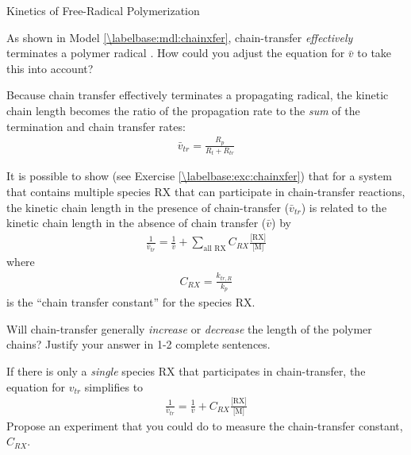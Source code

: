 \begin{activity}{Kinetics of Free-Radical Polymerization}
\begin{model}
\end{model}

\begin{ctqs}
	\question As shown in Model \ref{\labelbase:mdl:chainxfer}, chain-transfer \emph{effectively} terminates a polymer radical .
		How could you adjust the equation for $\bar v$ to take this into account?
		
		\begin{solution}[2in]
	
			Because chain transfer effectively terminates a propagating radical, the kinetic chain length becomes the ratio of the propagation rate to the \emph{sum} of the termination and chain transfer rates:
			\begin{align*}
				\bar v_{tr} = \frac{R_p}{R_t + R_{tr}}
			\end{align*}
	
		\end{solution}
		
\end{ctqs}

\begin{infobox}
\label{\labelbase:info:vtr}

	It is possible to show (see Exercise \ref{\labelbase:exc:chainxfer}) that for a system that contains multiple species RX that can participate in chain-transfer reactions, the kinetic chain length in the presence of chain-transfer ($\bar v_{tr}$) is related to the kinetic chain length in the absence of chain transfer ($\bar v$) by
	\begin{align*}
		\frac{1}{\bar v_{tr}} = \frac{1}{\bar v} + \sum_{\text{all RX}} C_{RX}\frac{\text{[RX]}}{\text{[M]}}
	\end{align*}
	where
	\begin{align*}
		C_{RX} = \frac{k_{tr,R}}{k_p}
	\end{align*}
	is the ``chain transfer constant'' for the species RX.
	
\end{infobox}

\begin{ctqs}

	\question Will chain-transfer generally \emph{increase} or \emph{decrease} the length of the polymer chains?  Justify your answer in 1-2 complete sentences.
	
		\begin{solution}[2in]
		\end{solution}
		
	\question If there is only a \emph{single} species RX that participates in chain-transfer, the equation for $v_{tr}$ simplifies to
	\begin{align*}
		\frac{1}{\bar v_{tr}} = \frac{1}{\bar v} + C_{RX}\frac{\text{[RX]}}{\text{[M]}}
	\end{align*}
		Propose an experiment that you could do to measure the chain-transfer constant, $C_{RX}$.
		

\end{ctqs}
\end{activity}
